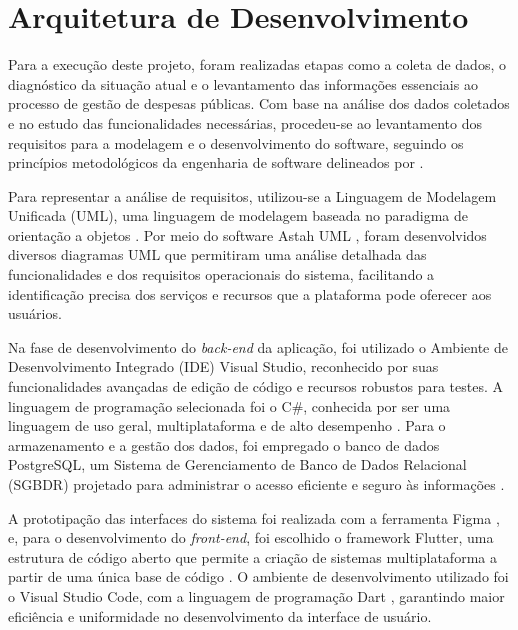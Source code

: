 \section{Arquitetura de Desenvolvimento}

Para a execução deste projeto, foram realizadas etapas como a coleta de dados, o diagnóstico da situação atual e o levantamento das informações essenciais ao processo de gestão de despesas públicas. Com base na análise dos dados coletados e no estudo das funcionalidades necessárias, procedeu-se ao levantamento dos requisitos para a modelagem e o desenvolvimento do software, seguindo os princípios metodológicos da engenharia de software delineados por \textcite{Pressman2011ES7}.

Para representar a análise de requisitos, utilizou-se a Linguagem de Modelagem Unificada (UML), uma linguagem de modelagem baseada no paradigma de orientação a objetos \parencite{Guedes2018UML2}. Por meio do software Astah UML \parencite{AstahUML}, foram desenvolvidos diversos diagramas UML que permitiram uma análise detalhada das funcionalidades e dos requisitos operacionais do sistema, facilitando a identificação precisa dos serviços e recursos que a plataforma pode oferecer aos usuários.

Na fase de desenvolvimento do \textit{back-end} da aplicação, foi utilizado o Ambiente de Desenvolvimento Integrado (IDE) Visual Studio, reconhecido por suas funcionalidades avançadas de edição de código e recursos robustos para testes. A linguagem de programação selecionada foi o C\#, conhecida por ser uma linguagem de uso geral, multiplataforma e de alto desempenho \parencite{Wagner2024TourCSharp}. Para o armazenamento e a gestão dos dados, foi empregado o banco de dados PostgreSQL, um Sistema de Gerenciamento de Banco de Dados Relacional (SGBDR) projetado para administrar o acesso eficiente e seguro às informações \parencite{Milani2008PostgreSQL}.

A prototipação das interfaces do sistema foi realizada com a ferramenta Figma \parencite{Figma2024}, e, para o desenvolvimento do \textit{front-end}, foi escolhido o framework Flutter, uma estrutura de código aberto que permite a criação de sistemas multiplataforma a partir de uma única base de código \parencite{Flutter2024}. O ambiente de desenvolvimento utilizado foi o Visual Studio Code, com a linguagem de programação Dart \parencite{DartSite2024}, garantindo maior eficiência e uniformidade no desenvolvimento da interface de usuário.

